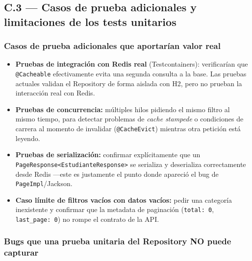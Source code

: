 \documentclass[12pt]{article}
\begin{document}
	\subsection*{C.3 — Casos de prueba adicionales y limitaciones de los tests unitarios}
	
	\subsubsection*{Casos de prueba adicionales que aportarían valor real}
	
	\begin{itemize}
		\item \textbf{Pruebas de integración con Redis real} (Testcontainers): verificarían que \texttt{@Cacheable} efectivamente evita una segunda consulta a la base. Las pruebas actuales validan el Repository de forma aislada con H2, pero no prueban la interacción real con Redis.
		
		\item \textbf{Pruebas de concurrencia:} múltiples hilos pidiendo el mismo filtro al mismo tiempo, para detectar problemas de \textit{cache stampede} o condiciones de carrera al momento de invalidar (\texttt{@CacheEvict}) mientras otra petición está leyendo.
		
		\item \textbf{Pruebas de serialización:} confirmar explícitamente que un \texttt{PageResponse<EstudianteResponse>} se serializa y deserializa correctamente desde Redis —este es justamente el punto donde apareció el bug de \texttt{PageImpl}/Jackson.
		
		\item \textbf{Caso límite de filtros vacíos con datos vacíos:} pedir una categoría inexistente y confirmar que la metadata de paginación (\texttt{total: 0}, \texttt{last\_page: 0}) no rompe el contrato de la API.
	\end{itemize}
	
	\subsubsection*{Bugs que una prueba unitaria del Repository NO puede capturar}
	
\end{document}
